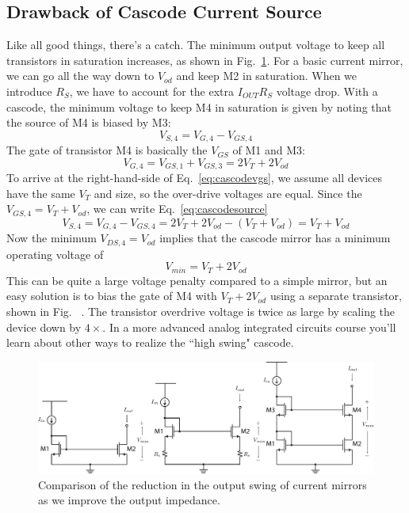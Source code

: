 \subsection{Drawback of Cascode Current Source}
Like all good things, there's a catch.  The minimum output voltage to keep all transistors in saturation increases, as shown in Fig.~\ref{fig:mirrors_vmin}.  For a basic current mirror, we can go all the way down to $V_{od}$ and keep M2 in saturation.  When we introduce $R_S$, we have to account for the extra $I_{OUT} R_S$ voltage drop.  With a cascode, the minimum voltage to keep M4 in saturation is given by noting that the source of M4 is biased by M3:
    \begin{equation}
        V_{S,4} = V_{G,4} - V_{GS,4}
        \label{eq:cascodesource}
    \end{equation}
The gate of transistor M4 is basically the $V_{GS}$ of M1 and M3:
    \begin{equation}
        V_{G,4} = V_{GS,1} + V_{GS,3} = 2 V_T + 2 V_{od}
        \label{eq:cascodevgs}
    \end{equation}
To arrive at the right-hand-side of Eq.~\ref{eq:cascodevgs}, we assume all devices have the same $V_T$ and size, so the over-drive voltages are equal.  Since the $V_{GS,4} = V_T + V_{od}$, we can write Eq.~\ref{eq:cascodesource}
    \begin{equation}
        V_{S,4} = V_{G,4} - V_{GS,4}   = 2 V_T + 2 V_{od} - ( V_T + V_{od} ) = V_T + V_{od}
    \end{equation}
Now the minimum $V_{DS,4} = V_{od}$ implies that the cascode mirror has a minimum operating voltage of
    \begin{equation}
        V_{min} = V_T + 2 V_{od}
    \end{equation}
This can be quite a large voltage penalty compared to a simple mirror, but an easy solution is to bias the gate of M4 with $V_T + 2 V_{od}$ using a separate transistor, shown in Fig.~ \label{fig:cascode_hiswing}.  The transistor overdrive voltage is twice as large by scaling the device down by $4\times$.  In a more advanced analog integrated circuits course you'll learn about other ways to realize the ``high swing" cascode.
\begin{figure}[tb]
\centering
\includegraphics[width=\columnwidth]{mirrors_vmin}
\caption{Comparison of the reduction in the output swing of current mirrors as we improve the output impedance.}
\label{fig:mirrors_vmin}
\end{figure}
